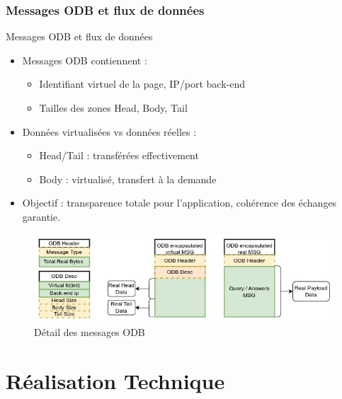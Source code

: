 \documentclass[aspectratio=43,8pt]{beamer}
\begin{document}
\section{Messages ODB et flux de données}
\begin{frame}{Messages ODB et flux de données}
\begin{itemize}
    \item Messages ODB contiennent :
    \begin{itemize}
        \item Identifiant virtuel de la page, IP/port back-end
        \item Tailles des zones Head, Body, Tail
    \end{itemize}
    \item Données virtualisées vs données réelles :
    \begin{itemize}
        \item Head/Tail : transférées effectivement
        \item Body : virtualisé, transfert à la demande
    \end{itemize}
    \item Objectif : transparence totale pour l'application, cohérence des échanges garantie.
\end{itemize}
\begin{figure}
    \centering
    \includegraphics[scale=0.3]{img2/odb_c_messages.jpg}
    \caption{Détail des messages ODB}
\end{figure}
\end{frame}


\part{Réalisation Technique}
\end{document}
